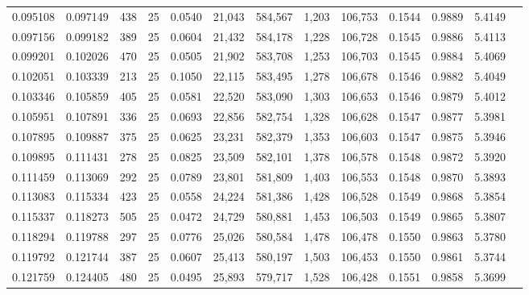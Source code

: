 \begin{tabular}{rrrrrrrrrrrrr}
0.095108 & 0.097149 &   438 &  25 &                                     0.0540 &  21,043 & 584,567 &   1,203 & 106,753 & 0.1544 & 0.9889 & 5.4149 \\
0.097156 & 0.099182 &   389 &  25 &                                     0.0604 &  21,432 & 584,178 &   1,228 & 106,728 & 0.1545 & 0.9886 & 5.4113 \\
0.099201 & 0.102026 &   470 &  25 &                                     0.0505 &  21,902 & 583,708 &   1,253 & 106,703 & 0.1545 & 0.9884 & 5.4069 \\
0.102051 & 0.103339 &   213 &  25 &                                     0.1050 &  22,115 & 583,495 &   1,278 & 106,678 & 0.1546 & 0.9882 & 5.4049 \\
0.103346 & 0.105859 &   405 &  25 &                                     0.0581 &  22,520 & 583,090 &   1,303 & 106,653 & 0.1546 & 0.9879 & 5.4012 \\
0.105951 & 0.107891 &   336 &  25 &                                     0.0693 &  22,856 & 582,754 &   1,328 & 106,628 & 0.1547 & 0.9877 & 5.3981 \\
0.107895 & 0.109887 &   375 &  25 &                                     0.0625 &  23,231 & 582,379 &   1,353 & 106,603 & 0.1547 & 0.9875 & 5.3946 \\
0.109895 & 0.111431 &   278 &  25 &                                     0.0825 &  23,509 & 582,101 &   1,378 & 106,578 & 0.1548 & 0.9872 & 5.3920 \\
0.111459 & 0.113069 &   292 &  25 &                                     0.0789 &  23,801 & 581,809 &   1,403 & 106,553 & 0.1548 & 0.9870 & 5.3893 \\
0.113083 & 0.115334 &   423 &  25 &                                     0.0558 &  24,224 & 581,386 &   1,428 & 106,528 & 0.1549 & 0.9868 & 5.3854 \\
0.115337 & 0.118273 &   505 &  25 &                                     0.0472 &  24,729 & 580,881 &   1,453 & 106,503 & 0.1549 & 0.9865 & 5.3807 \\
0.118294 & 0.119788 &   297 &  25 &                                     0.0776 &  25,026 & 580,584 &   1,478 & 106,478 & 0.1550 & 0.9863 & 5.3780 \\
0.119792 & 0.121744 &   387 &  25 &                                     0.0607 &  25,413 & 580,197 &   1,503 & 106,453 & 0.1550 & 0.9861 & 5.3744 \\
0.121759 & 0.124405 &   480 &  25 &                                     0.0495 &  25,893 & 579,717 &   1,528 & 106,428 & 0.1551 & 0.9858 & 5.3699 \\

\end{tabular}
